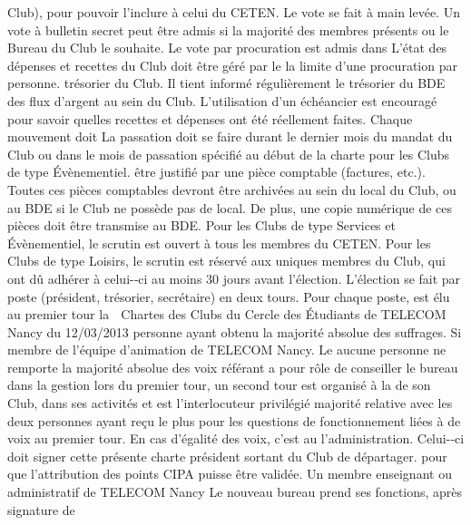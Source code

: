 \documentclass{article} %
\begin{document}
\begin{multicols}{2}
   Club),  pour  pouvoir  l’inclure  à  celui  du  CETEN.  
Le  vote  se  fait  à  main  levée.  Un  vote  à  bulletin  secret  peut   être  admis  si  la  majorité  des  membres  présents  ou  le  Bureau   du  Club  le  souhaite.  Le  vote  par  procuration  est  admis  dans  
L’état  des  dépenses  et  recettes  du  Club  doit  être  géré  par  le  
la  limite  d’une  procuration  par  personne.  
trésorier  du  Club.  Il  tient  informé  régulièrement  le  trésorier   du  BDE  des  flux  d’argent  au  sein  du  Club.  L’utilisation  d’un   échéancier   est   encouragé   pour   savoir   quelles   recettes   et   dépenses  ont  été  réellement  faites.  Chaque  mouvement  doit  
La  passation  doit  se  faire  durant  le  dernier  mois  du  mandat   du  Club  ou  dans  le  mois  de  passation  spécifié  au  début  de  la   charte  pour  les  Clubs  de  type  Évènementiel.  
être  justifié  par  une  pièce  comptable  (factures,  etc.).  Toutes   ces   pièces   comptables   devront   être   archivées   au   sein   du   local  du  Club,  ou  au  BDE  si  le  Club  ne  possède  pas  de  local.   De   plus,   une   copie   numérique   de   ces   pièces   doit   être   transmise  au  BDE.  
Pour   les   Clubs   de   type  Services   et  Évènementiel,   le   scrutin   est  ouvert  à  tous  les  membres  du  CETEN.  Pour  les  Clubs  de   type  Loisirs,  le  scrutin  est  réservé  aux  uniques  membres  du   Club,  qui  ont  dû  adhérer  à  celui-­‐ci  au  moins  30  jours  avant   l’élection.  
L’élection  se  fait  par  poste  (président,  trésorier,  secrétaire)   en  deux  tours.  Pour  chaque  poste,  est  élu  au  premier  tour  la  

Chartes  des  Clubs  du  Cercle  des  Étudiants  de  TELECOM  Nancy  du  12/03/2013  
personne  ayant  obtenu  la  majorité  absolue  des  suffrages.  Si  
membre   de   l’équipe   d’animation   de   TELECOM   Nancy.   Le   aucune  personne  ne  remporte  la  majorité  absolue  des  voix  
référant  a  pour  rôle  de  conseiller  le  bureau  dans  la  gestion   lors   du   premier   tour,   un   second   tour   est   organisé   à   la  
de  son  Club,  dans  ses  activités  et  est  l’interlocuteur  privilégié   majorité  relative  avec  les  deux  personnes  ayant  reçu  le  plus  
pour   les   questions   de   fonctionnement   liées   à   de  voix  au  premier  tour.  En  cas  d’égalité  des  voix,  c’est  au  
l’administration.   Celui-­‐ci   doit   signer   cette   présente   charte   président    sortant  du  Club  de  départager.  
pour   que   l’attribution   des   points   CIPA   puisse   être   validée.   Un  membre  enseignant  ou  administratif  de  TELECOM  Nancy   Le  nouveau  bureau  prend  ses  fonctions,  après  signature  de  

\end{multicols}
\end{document}
